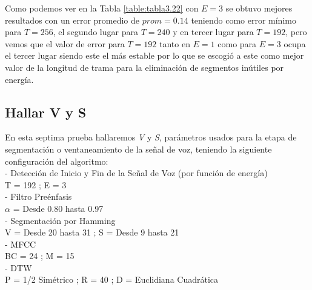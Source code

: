 Como podemos ver en la Tabla \ref{table:tabla3.22} con $E = 3$ se obtuvo mejores resultados con un error promedio de $prom = 0.14$ teniendo como error mínimo para $T = 256$, el segundo lugar para $T = 240$ y en tercer lugar para $T = 192$, pero vemos que el valor de error para $T = 192$ tanto en $E = 1$ como para $E = 3$ ocupa el tercer lugar siendo este el más estable por lo que se escogió a este como mejor valor de la longitud de trama para la eliminación de segmentos inútiles por energía.

\subsection{Hallar V y S}
En esta septima prueba hallaremos \textit{V} y \textit{S}, parámetros usados para la etapa de segmentación o ventaneamiento de la señal de voz, teniendo la siguiente configuración del algoritmo:\\
- Detección de Inicio y Fin de la Señal de Voz (por función de energía) \\
\hspace*{1cm} T = 192 ; \qquad E = 3 \\
- Filtro Preénfasis \\
\hspace*{1cm} $\alpha$ = Desde 0.80 hasta 0.97 \\
- Segmentación por Hamming \\
\hspace*{1cm} V = Desde 20 hasta 31 ; \qquad S = Desde 9 hasta 21 \\
- MFCC \\
\hspace*{1cm} BC = 24 ; \qquad M = 15 \\
- DTW \\
\hspace*{1cm} P = 1/2 Simétrico ; \qquad R = 40 ; \qquad D = Euclidiana Cuadrática 

